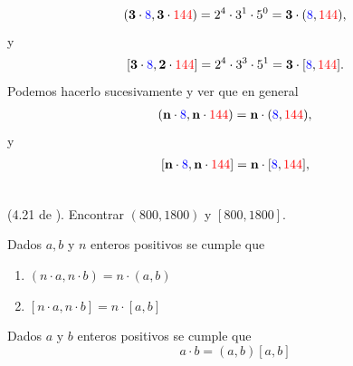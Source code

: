 \begin{ejemplo}
\begin{equation*}
\begin{split}
	(\textbf{3}\cdot \color{blue} 8\color{black},\textbf{3}\cdot \color{red} 144 \color{black})= 2^4\cdot3^1\cdot 5^0=\textbf{3}\cdot(\color{blue} 8\color{black}, \color{red} 144 \color{black}),
	\end{split}
	\end{equation*}
	y
	\begin{equation*}
	\begin{split}
	[\textbf{3}\cdot \color{blue} 8\color{black},\textbf{2}\cdot \color{red} 144 \color{black}]= 2^4\cdot3^3\cdot 5^1=\textbf{3}\cdot[\color{blue} 8\color{black}, \color{red} 144 \color{black}].
	\end{split}
	\end{equation*}
	Podemos hacerlo sucesivamente y ver que en general
		\begin{equation*}
		\begin{split}
		(\textbf{n}\cdot \color{blue} 8\color{black},\textbf{n}\cdot \color{red} 144 \color{black})=\textbf{n}\cdot(\color{blue} 8\color{black}, \color{red} 144 \color{black}),
		\end{split}
		\end{equation*}
		y
		\begin{equation*}
		\begin{split}
				[\textbf{n}\cdot \color{blue} 8\color{black},\textbf{n}\cdot \color{red} 144 \color{black}]=\textbf{n}\cdot[\color{blue} 8\color{black}, \color{red} 144 \color{black}],
		\end{split}
		\end{equation*}
\end{ejemplo}

\begin{exer}{\ \\}
	(4.21 de \cite{Aops_TN}). Encontrar  $(800,1800)$ y $[800,1800]$.
\end{exer}

\begin{prop}
Dados $a,b$ y $n$ enteros positivos se cumple que 
\begin{enumerate}
		\item $(n\cdot a,n\cdot b)= n\cdot (a,b)$
		\item $[n\cdot a,n\cdot b]= n\cdot [a,b]$		
\end{enumerate}
\end{prop}

\begin{prop}
	Dados $a$ y $b$ enteros positivos se cumple que 
	\[a\cdot b= (a,b)[a,b]\]
\end{prop}

